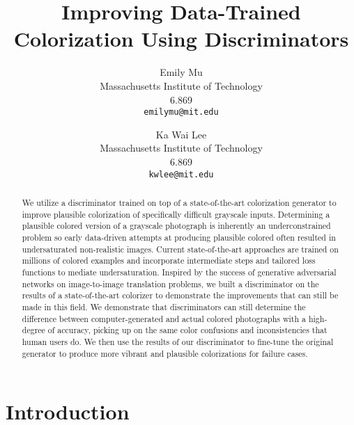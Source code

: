 \documentclass[10pt,twocolumn,letterpaper]{article}
\begin{document}
\title{Improving Data-Trained Colorization Using Discriminators }

\author{Emily Mu\\
Massachusetts Institute of Technology\\
6.869\\
{\tt\small emilymu@mit.edu}
\and
Ka Wai Lee\\
Massachusetts Institute of Technology\\
6.869\\
{\tt\small kwlee@mit.edu}
}

\maketitle

\begin{abstract}
We utilize a discriminator trained on top of a state-of-the-art colorization generator to improve plausible colorization of specifically difficult grayscale inputs. Determining a plausible colored version of a grayscale photograph is inherently an underconstrained problem so early data-driven attempts at producing plausible colored often resulted in undersaturated non-realistic images. Current state-of-the-art approaches are trained on millions of colored examples and incorporate intermediate steps and tailored loss functions to mediate undersaturation. Inspired by the success of generative adversarial networks on image-to-image translation problems, we built a discriminator on the results of a state-of-the-art colorizer to demonstrate the improvements that can still be made in this field. We demonstrate that discriminators can still determine the difference between computer-generated and actual colored photographs with a high-degree of accuracy, picking up on the same color confusions and inconsistencies that human users do. We then use the results of our discriminator to fine-tune the original generator to produce more vibrant and plausible colorizations for failure cases. 
\end{abstract}

\section{Introduction}
\end{document}
